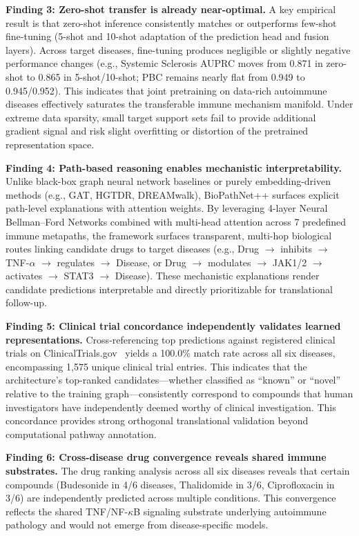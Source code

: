 \documentclass[conference]{IEEEtran}
\begin{document}
\textbf{Finding 3: Zero-shot transfer is already near-optimal.} A key empirical result is that zero-shot inference consistently matches or outperforms few-shot fine-tuning (5-shot and 10-shot adaptation of the prediction head and fusion layers). Across target diseases, fine-tuning produces negligible or slightly negative performance changes (e.g., Systemic Sclerosis AUPRC moves from 0.871 in zero-shot to 0.865 in 5-shot/10-shot; PBC remains nearly flat from 0.949 to 0.945/0.952). This indicates that joint pretraining on data-rich autoimmune diseases effectively saturates the transferable immune mechanism manifold. Under extreme data sparsity, small target support sets fail to provide additional gradient signal and risk slight overfitting or distortion of the pretrained representation space.

\textbf{Finding 4: Path-based reasoning enables mechanistic interpretability.} Unlike black-box graph neural network baselines or purely embedding-driven methods (e.g., GAT, HGTDR, DREAMwalk), BioPathNet++ surfaces explicit path-level explanations with attention weights. By leveraging 4-layer Neural Bellman--Ford Networks combined with multi-head attention across 7 predefined immune metapaths, the framework surfaces transparent, multi-hop biological routes linking candidate drugs to target diseases (e.g., Drug $\rightarrow$ inhibits $\rightarrow$ TNF-$\alpha$ $\rightarrow$ regulates $\rightarrow$ Disease, or Drug $\rightarrow$ modulates $\rightarrow$ JAK1/2 $\rightarrow$ activates $\rightarrow$ STAT3 $\rightarrow$ Disease). These mechanistic explanations render candidate predictions interpretable and directly prioritizable for translational follow-up.

\textbf{Finding 5: Clinical trial concordance independently validates learned representations.} Cross-referencing top predictions against registered clinical trials on ClinicalTrials.gov~\cite{clinicaltrials} yields a 100.0\% match rate across all six diseases, encompassing 1,575 unique clinical trial entries. This indicates that the architecture's top-ranked candidates---whether classified as ``known'' or ``novel'' relative to the training graph---consistently correspond to compounds that human investigators have independently deemed worthy of clinical investigation. This concordance provides strong orthogonal translational validation beyond computational pathway annotation.

\textbf{Finding 6: Cross-disease drug convergence reveals shared immune substrates.} The drug ranking analysis across all six diseases reveals that certain compounds (Budesonide in 4/6 diseases, Thalidomide in 3/6, Ciprofloxacin in 3/6) are independently predicted across multiple conditions. This convergence reflects the shared TNF/NF-$\kappa$B signaling substrate underlying autoimmune pathology and would not emerge from disease-specific models.
\end{document}
